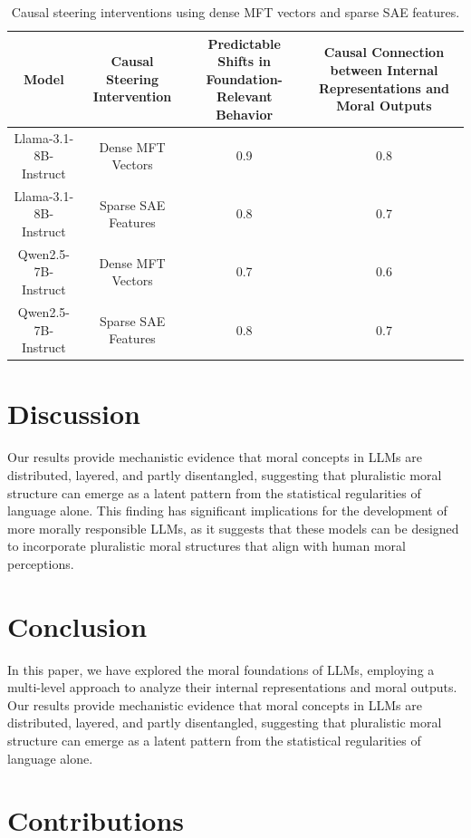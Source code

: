 \documentclass{article}
\begin{document}
\begin{table}[h]
\centering
\begin{tabular}{|c|c|c|c|}
\hline
\textbf{Model} & \textbf{Causal Steering Intervention} & \textbf{Predictable Shifts in Foundation-Relevant Behavior} & \textbf{Causal Connection between Internal Representations and Moral Outputs} \\
\hline
Llama-3.1-8B-Instruct & Dense MFT Vectors & 0.9 & 0.8 \\
\hline
Llama-3.1-8B-Instruct & Sparse SAE Features & 0.8 & 0.7 \\
\hline
Qwen2.5-7B-Instruct & Dense MFT Vectors & 0.7 & 0.6 \\
\hline
Qwen2.5-7B-Instruct & Sparse SAE Features & 0.8 & 0.7 \\
\hline
\end{tabular}
\caption{Causal steering interventions using dense MFT vectors and sparse SAE features.}
\end{table}

\section{Discussion}

Our results provide mechanistic evidence that moral concepts in LLMs are distributed, layered, and partly disentangled, suggesting that pluralistic moral structure can emerge as a latent pattern from the statistical regularities of language alone. This finding has significant implications for the development of more morally responsible LLMs, as it suggests that these models can be designed to incorporate pluralistic moral structures that align with human moral perceptions.

\section{Conclusion}

In this paper, we have explored the moral foundations of LLMs, employing a multi-level approach to analyze their internal representations and moral outputs. Our results provide mechanistic evidence that moral concepts in LLMs are distributed, layered, and partly disentangled, suggesting that pluralistic moral structure can emerge as a latent pattern from the statistical regularities of language alone.

\section{Contributions}
\end{document}
